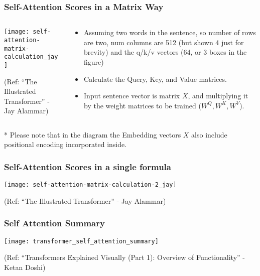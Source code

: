 \begin{frame}[fragile]\frametitle{Self-Attention Scores in a Matrix Way}

\begin{columns}
    \begin{column}[T]{0.5\linewidth}
\begin{center}
\texttt{[image: self-attention-matrix-calculation\_jay]}


{\tiny (Ref: ``The Illustrated Transformer'' - Jay Alammar)}
\end{center}		

		\end{column}
    \begin{column}[T]{0.5\linewidth}

\begin{itemize}
\item Assuming two words in the sentence, so number of rows are two, num columns are 512 (but shown 4 just for brevity) and the q/k/v vectors (64, or 3 boxes in the figure)
\item  Calculate the Query, Key, and Value matrices. 
\item Input sentence vector is matrix $X$, and multiplying it by the weight matrices to be trained ($W^Q, W^K, W^V$).
\end{itemize}
    \end{column}
  \end{columns}

* Please note that in the diagram the Embedding vectors $X$ also include positional encoding incorporated inside.
\end{frame}

\begin{frame}[fragile]\frametitle{Self-Attention Scores in a single formula}


\begin{center}
\texttt{[image: self-attention-matrix-calculation-2\_jay]}


{\tiny (Ref: ``The Illustrated Transformer'' - Jay Alammar)}
\end{center}		

\end{frame}



\begin{frame}[fragile]\frametitle{Self Attention Summary}


\begin{center}
\texttt{[image: transformer\_self\_attention\_summary]}


{\tiny (Ref: ``Transformers Explained Visually (Part 1): Overview of Functionality'' - Ketan Doshi)}
\end{center}		


\end{frame}


